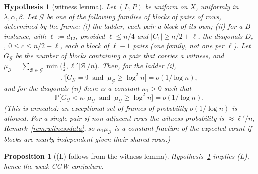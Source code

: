 \documentclass[11pt]{article}
\newtheorem{proposition}[theorem]{Proposition}
\newtheorem{hypothesis}[theorem]{Hypothesis}
\theoremstyle{definition}
\renewcommand{\Pr}{\mathbb{P}}
\begin{document}
\begin{hypothesis}[witness lemma]\label{hyp:witness}
Let $(L,P)$ be uniform on $X$, uniformly in $\lambda,\alpha,\beta$.  Let
$\mathcal G$ be one of the following families of \emph{blocks} of pairs
of rows, determined by the frame: (i) the ladder, each pair a block of
its own; (ii) for a $B$-instance, with $\ell:=d_{12}$, provided
$\ell\le n/4$ and $|C_1|\ge n/2+\ell$, the diagonals $D_c$,
$0\le c\le n/2-\ell$, each a block of $\ell-1$ pairs (one family, not
one per $\ell$).  Let $G_{\mathcal G}$ be the number of blocks
containing a pair that carries a witness, and
$\mu_{\mathcal G}=\sum_{\mathcal B\in\mathcal G}\min\bigl(\tfrac12,\ell'|\mathcal B|/n\bigr)$.
Then, for the ladder (i),
\[
\Pr\bigl[G_{\mathcal G}=0\ \text{ and }\ \mu_{\mathcal G}\ge\log^2n\bigr]=o(1/\log n),
\]
and for the diagonals (ii) there is a constant $\kappa_1>0$ such that
\[
\Pr\bigl[G_{\mathcal G}<\kappa_1\,\mu_{\mathcal G}\ \text{ and }\ \mu_{\mathcal G}\ge\log^2n\bigr]=o(1/\log n).
\]
(This is annealed: an exceptional set of frames of probability
$o(1/\log n)$ is allowed.  For a single pair of non-adjacent rows the
witness probability is $\approx\ell'/n$, Remark~\ref{rem:witnessdata},
so $\kappa_1\mu_{\mathcal G}$ is a constant fraction of the expected
count if blocks are nearly independent given their shared rows.)
\end{hypothesis}

\begin{proposition}[(L) follows from the witness lemma]\label{prop:Lwitness}
Hypothesis~\ref{hyp:witness} implies \textup{(L)}, hence the weak CGW
conjecture.
\end{proposition}
\end{document}

